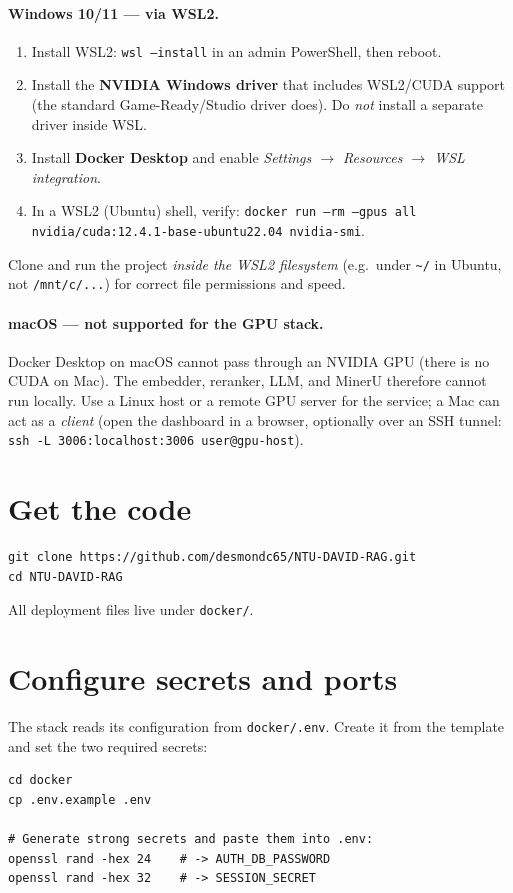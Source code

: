 \documentclass[11pt,a4paper]{article}
\newcommand{\code}[1]{\texttt{\small #1}}
\begin{document}
\paragraph{Windows 10/11 --- via WSL2.}
\begin{enumerate}[leftmargin=1.5em,itemsep=2pt]
  \item Install WSL2: \code{wsl --install} in an admin PowerShell, then reboot.
  \item Install the \textbf{NVIDIA Windows driver} that includes WSL2/CUDA
        support (the standard Game-Ready/Studio driver does). Do \emph{not}
        install a separate driver inside WSL.
  \item Install \textbf{Docker Desktop} and enable
        \emph{Settings $\rightarrow$ Resources $\rightarrow$ WSL integration}.
  \item In a WSL2 (Ubuntu) shell, verify:
        \code{docker run --rm --gpus all nvidia/cuda:12.4.1-base-ubuntu22.04 nvidia-smi}.
\end{enumerate}
Clone and run the project \emph{inside the WSL2 filesystem} (e.g.\ under
\code{\textasciitilde/} in Ubuntu, not \code{/mnt/c/...}) for correct file
permissions and speed.

\paragraph{macOS --- not supported for the GPU stack.}
Docker Desktop on macOS cannot pass through an NVIDIA GPU (there is no CUDA on
Mac). The embedder, reranker, LLM, and MinerU therefore cannot run locally. Use
a Linux host or a remote GPU server for the service; a Mac can act as a
\emph{client} (open the dashboard in a browser, optionally over an SSH tunnel:
\code{ssh -L 3006:localhost:3006 user@gpu-host}).

\section{Get the code}
\begin{lstlisting}
git clone https://github.com/desmondc65/NTU-DAVID-RAG.git
cd NTU-DAVID-RAG
\end{lstlisting}
All deployment files live under \code{docker/}.

\section{Configure secrets and ports}\label{sec:config}
The stack reads its configuration from \code{docker/.env}. Create it from the
template and set the two required secrets:
\begin{lstlisting}
cd docker
cp .env.example .env

# Generate strong secrets and paste them into .env:
openssl rand -hex 24    # -> AUTH_DB_PASSWORD
openssl rand -hex 32    # -> SESSION_SECRET
\end{lstlisting}
\end{document}
